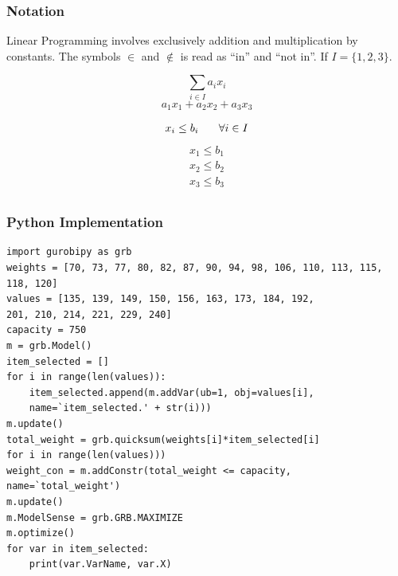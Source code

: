 \documentclass[12pt,handout]{beamer}
\begin{document}
\begin{frame}
\frametitle{Notation}
Linear Programming involves exclusively addition and multiplication by constants.
The symbols $\in$ and $\notin$ is read as ``in'' and ``not in''.
If $I = \{1,2,3\}.$
\begin{block}{$$\sum_{i \in I} a_i x_i$$}
$$a_1 x_1 + a_2 x_2 + a_3 x_3$$
\end{block}
\begin{block}{$$x_i \le b_i \hspace{0.25in} \forall i \in I$$}
\begin{align*}
x_1 \le b_1 \\
x_2 \le b_2 \\
x_3 \le b_3 \\
\end{align*}
\end{block}
\end{frame}


\begin{frame} [containsverbatim]
\frametitle{Python Implementation}
\scriptsize
\begin{verbatim}
import gurobipy as grb
weights = [70, 73, 77, 80, 82, 87, 90, 94, 98, 106, 110, 113, 115, 118, 120]
values = [135, 139, 149, 150, 156, 163, 173, 184, 192, 
201, 210, 214, 221, 229, 240]
capacity = 750
m = grb.Model()
item_selected = []
for i in range(len(values)):
    item_selected.append(m.addVar(ub=1, obj=values[i], 
    name=`item_selected.' + str(i)))
m.update()
total_weight = grb.quicksum(weights[i]*item_selected[i] 
for i in range(len(values)))
weight_con = m.addConstr(total_weight <= capacity, name=`total_weight')
m.update()
m.ModelSense = grb.GRB.MAXIMIZE
m.optimize()
for var in item_selected:
    print(var.VarName, var.X)
\end{verbatim}
\end{frame}
\end{document}
